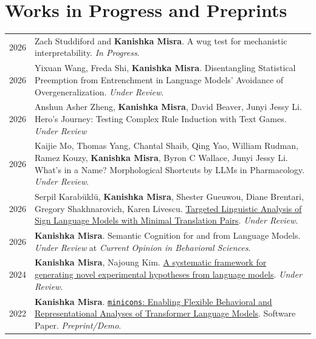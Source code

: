 \documentclass[11pt]{article}
\begin{document}
\section*{Works in Progress and Preprints}
\vspace{-1.5em}
\renewcommand*{\arraystretch}{1.5}
\begin{longtable}{p{}  p{} }

2026 & Zach Studdiford and \textbf{Kanishka Misra}. A wug test for mechanistic interpretability. \textit{In Progress}.\\

2026 & Yixuan Wang, Freda Shi, \textbf{Kanishka Misra}. Disentangling Statistical Preemption from Entrenchment in Language
Models' Avoidance of Overgeneralization. \textit{Under Review}.\\

2026 & Anshun Asher Zheng, \textbf{Kanishka Misra}, David Beaver, Junyi Jessy Li. Hero's Journey: Testing Complex Rule Induction with Text Games. \textit{Under Review} \\

2026 & Kaijie Mo, Thomas Yang, Chantal Shaib, Qing Yao, William Rudman, Ramez Kouzy, \textbf{Kanishka Misra}, Byron C Wallace, Junyi Jessy Li. What's in a Name? Morphological Shortcuts by LLMs in Pharmacology. \textit{Under Review}.\\

2026 & Serpil Karabüklü, \textbf{Kanishka Misra}, Shester Gueuwou, Diane Brentari, Gregory Shakhnarovich, Karen Livescu. \href{https://arxiv.org/abs/2604.27232}{Targeted Linguistic Analysis of Sign Language Models with Minimal Translation Pairs}. \textit{Under Review}.\\

2026 & \textbf{Kanishka Misra}. Semantic Cognition for and from Language Models. \textit{Under Review} at \textit{Current Opinion in Behavioral Sciences}.\\

2024 & \textbf{Kanishka Misra}, Najoung Kim. \href{https://arxiv.org/abs/2408.05086}{A systematic framework for generating novel experimental hypotheses from language models}. \textit{Under Review}.\\

2022 & \textbf{Kanishka Misra}. \href{https://arxiv.org/abs/2203.13112}{\texttt{minicons}: Enabling Flexible Behavioral and Representational Analyses of Transformer Language Models}. Software Paper. \textit{Preprint/Demo}.
\end{longtable}
\end{document}
